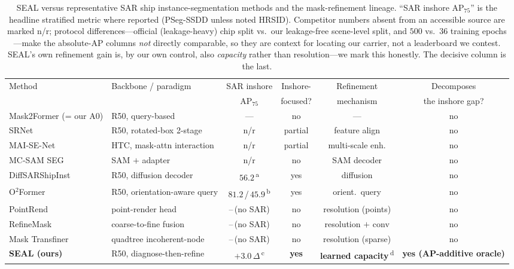 \documentclass[journal]{IEEEtran}
\begin{document}
\begin{table}[t]
\centering
\caption{SEAL versus representative SAR ship instance-segmentation methods and the mask-refinement lineage. ``SAR inshore AP$_{75}$'' is the headline stratified metric where reported (PSeg-SSDD unless noted HRSID). Competitor numbers absent from an accessible source are marked n/r; protocol differences---official (leakage-heavy) chip split vs.\ our leakage-free scene-level split, and $500$ vs.\ $36$ training epochs---make the absolute-AP columns \emph{not} directly comparable, so they are context for locating our carrier, not a leaderboard we contest. SEAL's own refinement gain is, by our own control, also \emph{capacity} rather than resolution---we mark this honestly. The decisive column is the last.}
\label{tab:relatedwork}
\small
\begin{tabular}{@{}llcccc@{}}
\toprule
Method & Backbone / paradigm & SAR inshore & Inshore- & Refinement & Decomposes \\
 &  & AP$_{75}$ & focused? & mechanism & the inshore gap? \\
\midrule
Mask2Former \cite{cheng2022mask2former} (= our A0) & R50, query-based & --- & no & --- & no \\
SRNet \cite{yang2023srnet} & R50, rotated-box 2-stage & n/r & partial & feature align & no \\
MAI-SE-Net \cite{zhang2022maisenet} & HTC, mask-attn interaction & n/r & partial & multi-scale enh. & no \\
MC-SAM SEG \cite{zheng2024mcsamseg} & SAM $+$ adapter & n/r & no & SAM decoder & no \\
DiffSARShipInst \cite{xu2025diffsarshipinst} & R50, diffusion decoder & $56.2$\,\textsuperscript{a} & yes & diffusion & no \\
O$^2$Former \cite{gao2025o2former} & R50, orientation-aware query & $81.2$\,/\,$45.9$\,\textsuperscript{b} & yes & orient.\ query & no \\
\midrule
PointRend \cite{kirillov2020pointrend} & point-render head & --\,(no SAR) & no & resolution (points) & no \\
RefineMask \cite{zhang2021refinemask} & coarse-to-fine fusion & --\,(no SAR) & no & resolution $+$ conv & no \\
Mask Transfiner \cite{ke2022masktransfiner} & quadtree incoherent-node & --\,(no SAR) & no & resolution (sparse) & no \\
\midrule
\textbf{SEAL (ours)} & R50, diagnose-then-refine & $+3.0$\,$\Delta$\,\textsuperscript{c} & \textbf{yes} & \textbf{learned capacity}\,\textsuperscript{d} & \textbf{yes (AP-additive oracle)} \\

\end{tabular}
\end{table}
\end{document}
